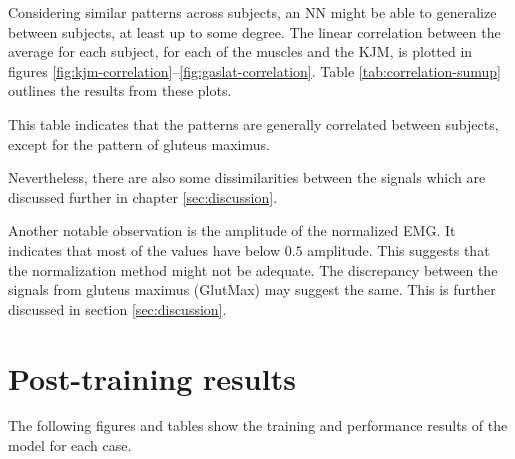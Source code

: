 \documentclass[../main.tex]{subfiles}
\begin{document}
Considering similar patterns across subjects, an \ac{NN} might be able to generalize between subjects, at least up to some degree.
The linear correlation between the average for each subject, for each of the muscles and the \ac{KJM}, is plotted in figures \ref{fig:kjm-correlation}--\ref{fig:gaslat-correlation}.
Table \ref{tab:correlation-sumup} outlines the results from these plots.

This table indicates that the patterns are generally correlated between subjects, except for the pattern of gluteus maximus.

Nevertheless, there are also some dissimilarities between the signals which are discussed further in chapter \ref{sec:discussion}.

Another notable observation is the amplitude of the normalized \ac{EMG}.
It indicates that most of the values have below $0.5$ amplitude.
This suggests that the normalization method might not be adequate.
The discrepancy between the signals from gluteus maximus (GlutMax) may suggest the same. 
This is further discussed in section \ref{sec:discussion}.

\section{Post-training results}
\label{sec:post-training-results}
The following figures and tables show the training and performance results of the model for each case.
\end{document}
